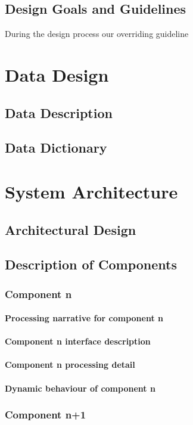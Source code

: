 \documentclass[]{report}
\begin{document}
\section{Design Goals and Guidelines}
During the design process our overriding guideline

\chapter{Data Design}
\section{Data Description}
\section{Data Dictionary}

\chapter{System Architecture}
\section{Architectural Design}
\section{Description of Components}
\subsection{Component n}
\subsubsection{Processing narrative for component n}
\subsubsection{Component n interface description}
\subsubsection{Component n processing detail}
\subsubsection{Dynamic behaviour of component n}
\subsection{Component n+1}
\end{document}

